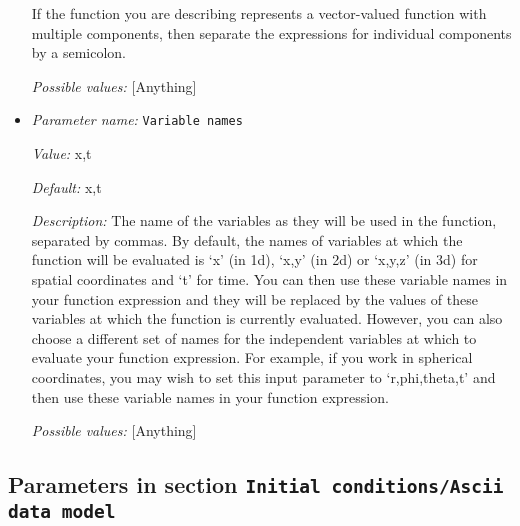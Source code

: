 \begin{itemize}
If the function you are describing represents a vector-valued function with multiple components, then separate the expressions for individual components by a semicolon.


{\it Possible values:} [Anything]
\item {\it Parameter name:} {\tt Variable names}
\label{parameters:Initial conditions/Adiabatic/Function/Variable names}


{\it Value:} x,t


{\it Default:} x,t


{\it Description:} The name of the variables as they will be used in the function, separated by commas. By default, the names of variables at which the function will be evaluated is `x' (in 1d), `x,y' (in 2d) or `x,y,z' (in 3d) for spatial coordinates and `t' for time. You can then use these variable names in your function expression and they will be replaced by the values of these variables at which the function is currently evaluated. However, you can also choose a different set of names for the independent variables at which to evaluate your function expression. For example, if you work in spherical coordinates, you may wish to set this input parameter to `r,phi,theta,t' and then use these variable names in your function expression.


{\it Possible values:} [Anything]
\end{itemize}

\subsection{Parameters in section \tt Initial conditions/Ascii data model}
\label{parameters:Initial_20conditions/Ascii_20data_20model}


